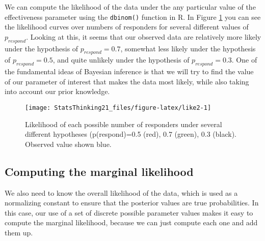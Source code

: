 \documentclass[]{book}
\newenvironment{Shaded}{\begin{snugshade}}{\end{snugshade}}
\newcommand{\KeywordTok}[1]{\textcolor[rgb]{0.13,0.29,0.53}{\textbf{#1}}}
\newcommand{\DataTypeTok}[1]{\textcolor[rgb]{0.13,0.29,0.53}{#1}}
\newcommand{\DecValTok}[1]{\textcolor[rgb]{0.00,0.00,0.81}{#1}}
\newcommand{\StringTok}[1]{\textcolor[rgb]{0.31,0.60,0.02}{#1}}
\newcommand{\CommentTok}[1]{\textcolor[rgb]{0.56,0.35,0.01}{\textit{#1}}}
\newcommand{\OperatorTok}[1]{\textcolor[rgb]{0.81,0.36,0.00}{\textbf{#1}}}
\newcommand{\NormalTok}[1]{#1}
\theoremstyle{definition}
\theoremstyle{definition}
\theoremstyle{definition}
\theoremstyle{remark}
\begin{document}
We can compute the likelihood of the data under the any particular value
of the effectiveness parameter using the \texttt{dbinom()} function in
R. In Figure \ref{fig:like2} you can see the likelihood curves over
numbers of responders for several different values of \(p_{respond}\).
Looking at this, it seems that our observed data are relatively more
likely under the hypothesis of \(p_{respond}=0.7\), somewhat less likely
under the hypothesis of \(p_{respond}=0.5\), and quite unlikely under
the hypothesis of \(p_{respond}=0.3\). One of the fundamental ideas of
Bayesian inference is that we will try to find the value of our
parameter of interest that makes the data most likely, while also taking
into account our prior knowledge.

\begin{figure}
\texttt{[image: StatsThinking21\_files/figure-latex/like2-1]} \caption{Likelihood of each possible number of responders under several different hypotheses (p(respond)=0.5 (red), 0.7 (green), 0.3 (black).  Observed value shown blue.}\label{fig:like2}
\end{figure}

\subsection{Computing the marginal
likelihood}\label{computing-the-marginal-likelihood-1}

We also need to know the overall likelihood of the data, which is used
as a normalizing constant to ensure that the posterior values are true
probabilities. In this case, our use of a set of discrete possible
parameter values makes it easy to compute the marginal likelihood,
because we can just compute each one and add them up.

\begin{Shaded}
\end{Shaded}
\end{document}

